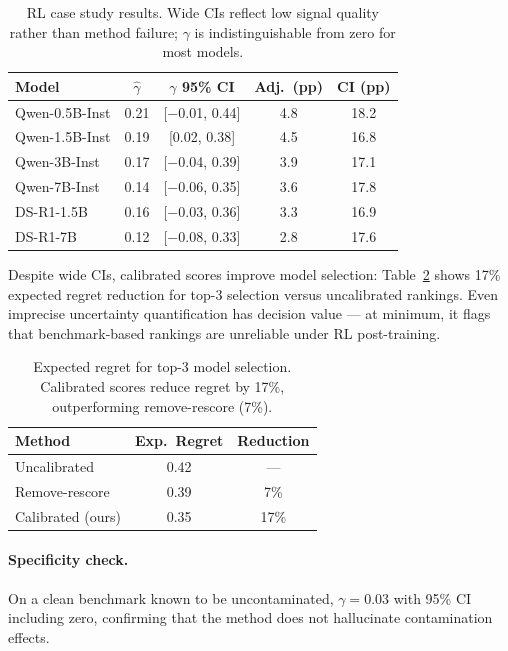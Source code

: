 \documentclass[letterpaper,11pt]{article}
\begin{document}
\begin{table}[t]
\centering
\caption{RL case study results. Wide CIs reflect low signal quality rather than method failure; $\gamma$ is indistinguishable from zero for most models.}
\label{tab:rl_models}
\small
\begin{tabular}{lcccc}
\toprule
Model & $\hat{\gamma}$ & $\gamma$ 95\% CI & Adj.\ (pp) & CI (pp) \\
\midrule
Qwen-0.5B-Inst & 0.21 & [$-$0.01, 0.44] & 4.8 & 18.2 \\
Qwen-1.5B-Inst & 0.19 & [0.02, 0.38] & 4.5 & 16.8 \\
Qwen-3B-Inst & 0.17 & [$-$0.04, 0.39] & 3.9 & 17.1 \\
Qwen-7B-Inst & 0.14 & [$-$0.06, 0.35] & 3.6 & 17.8 \\
DS-R1-1.5B & 0.16 & [$-$0.03, 0.36] & 3.3 & 16.9 \\
DS-R1-7B & 0.12 & [$-$0.08, 0.33] & 2.8 & 17.6 \\
\bottomrule
\end{tabular}
\end{table}

Despite wide CIs, calibrated scores improve model selection: Table~\ref{tab:regret} shows 17\% expected regret reduction for top-3 selection versus uncalibrated rankings. Even imprecise uncertainty quantification has decision value --- at minimum, it flags that benchmark-based rankings are unreliable under RL post-training.

\begin{table}[t]
\centering
\caption{Expected regret for top-3 model selection. Calibrated scores reduce regret by 17\%, outperforming remove-rescore (7\%).}
\label{tab:regret}
\small
\begin{tabular}{lcc}
\toprule
Method & Exp.\ Regret & Reduction \\
\midrule
Uncalibrated & 0.42 & --- \\
Remove-rescore & 0.39 & 7\% \\
Calibrated (ours) & 0.35 & 17\% \\
\bottomrule
\end{tabular}
\end{table}

\paragraph{Specificity check.} On a clean benchmark known to be uncontaminated, $\gamma = 0.03$ with 95\% CI including zero, confirming that the method does not hallucinate contamination effects.
\end{document}
